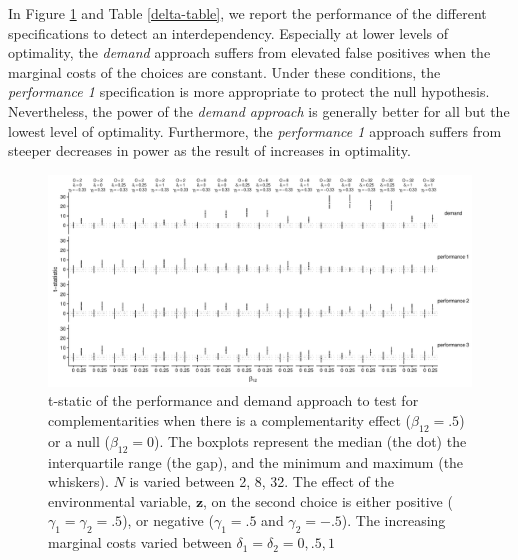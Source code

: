 \documentclass[12pt]{article}
\begin{document}
In Figure \ref{delta} and Table \ref{delta-table}, we report the performance of the different specifications to detect an interdependency. Especially at lower levels of optimality, the \emph{demand} approach suffers from elevated false positives when the marginal costs of the choices are constant. Under these conditions, the \emph{performance 1} specification is more appropriate to protect the null hypothesis. Nevertheless, the power of the \emph{demand approach} is generally better for all but the lowest level of optimality. Furthermore, the \emph{performance 1} approach suffers from steeper decreases in power as the result of increases in optimality.

\begin{figure}

\includegraphics[width=500px]{figure-latex/delta_plot.pdf}
\caption[The Error Rate and Power with Different Levels of Marginal Costs]
{\label{delta} t-static of the performance and demand approach to test
for complementarities when there is a complementarity effect ($\beta_{12} = .5$)
or a null ($\beta_{12} = 0$). The boxplots represent the median (the dot) the
interquartile range (the gap), and the minimum and maximum (the whiskers). $N$
is varied between 2, 8, 32. The effect of the environmental
variable, $\mathbf{z}$, on the second choice is either positive
($\gamma_1 = \gamma_2 = .5$), or negative ($\gamma_1 = .5$ and $\gamma_2 = -.5$).
The increasing marginal costs varied between $\delta_1 = \delta_2 = 0, .5, 1$}
\end{figure}


\end{document}
